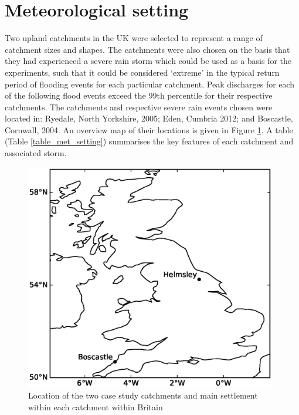\section{Meteorological setting}
Two upland catchments in the UK were selected to represent a range of catchment sizes and shapes. The catchments were also chosen on the basis that they had experienced a severe rain storm which could be used as a basis for the experiments, such that it could be considered `extreme' in the typical return period of flooding events for each particular catchment. Peak discharges for each of the following flood events exceed the 99th percentile for their respective catchments. The catchments and respective severe rain events chosen were located in: Ryedale, North Yorkshire, 2005; Eden, Cumbria 2012; and Boscastle, Cornwall, 2004. An overview map of their locations is given in Figure \ref{fig_location_map}. A table (Table \ref{table_met_setting}) summarises the key features of each catchment and associated storm.

\begin{figure}[htb]
\includegraphics[width=11cm]{chp_events_figures_scripts/figure_location_map.eps}
\caption{Location of the two case study catchments and main settlement within each catchment within Britain}
\label{fig_location_map}
\end{figure}

